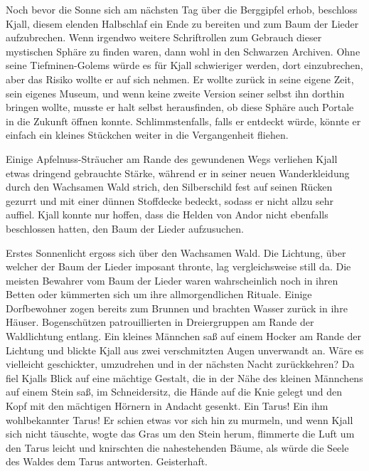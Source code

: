 Noch bevor die Sonne sich am nächsten Tag über die Berggipfel erhob, beschloss Kjall, diesem elenden Halbschlaf ein Ende zu bereiten und zum Baum der Lieder aufzubrechen. Wenn irgendwo weitere Schriftrollen zum Gebrauch dieser mystischen Sphäre zu finden waren, dann wohl in den Schwarzen Archiven. Ohne seine Tiefminen-Golems würde es für Kjall schwieriger werden, dort einzubrechen, aber das Risiko wollte er auf sich nehmen. Er wollte zurück in seine eigene Zeit, sein eigenes Museum, und wenn keine zweite Version seiner selbst ihn dorthin bringen wollte, musste er halt selbst herausfinden, ob diese Sphäre auch Portale in die Zukunft öffnen konnte. Schlimmstenfalls, falls er entdeckt würde, könnte er einfach ein kleines Stückchen weiter in die Vergangenheit fliehen.

Einige Apfelnuss-Sträucher am Rande des gewundenen Wegs verliehen Kjall etwas dringend gebrauchte Stärke, während er in seiner neuen Wanderkleidung durch den Wachsamen Wald strich, den Silberschild fest auf seinen Rücken gezurrt und mit einer dünnen Stoffdecke bedeckt, sodass er nicht allzu sehr auffiel. Kjall konnte nur hoffen, dass die Helden von Andor nicht ebenfalls beschlossen hatten, den Baum der Lieder aufzusuchen.



\trennzeichen



Erstes Sonnenlicht ergoss sich über den Wachsamen Wald. Die Lichtung, über welcher der Baum der Lieder imposant thronte, lag vergleichsweise still da. Die meisten Bewahrer vom Baum der Lieder waren wahrscheinlich noch in ihren Betten oder kümmerten sich um ihre allmorgendlichen Rituale. Einige Dorfbewohner zogen bereits zum Brunnen und brachten Wasser zurück in ihre Häuser. Bogenschützen patrouillierten in Dreiergruppen am Rande der Waldlichtung entlang. Ein kleines Männchen saß auf einem Hocker am Rande der Lichtung und blickte Kjall aus zwei verschmitzten Augen unverwandt an. Wäre es vielleicht geschickter, umzudrehen und in der nächsten Nacht zurückkehren? Da fiel Kjalls Blick auf eine mächtige Gestalt, die in der Nähe des kleinen Männchens auf einem Stein saß, im Schneidersitz, die Hände auf die Knie gelegt und den Kopf mit den mächtigen Hörnern in Andacht gesenkt. Ein Tarus! Ein ihm wohlbekannter Tarus! Er schien etwas vor sich hin zu murmeln, und wenn Kjall sich nicht täuschte, wogte das Gras um den Stein herum, flimmerte die Luft um den Tarus leicht und knirschten die nahestehenden Bäume, als würde die Seele des Waldes dem Tarus antworten. Geisterhaft.

